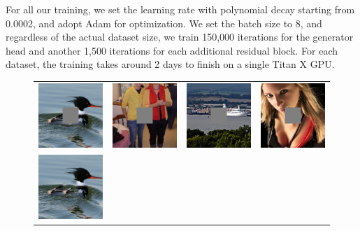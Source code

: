 For all our training, we set the learning rate with polynomial decay starting from 0.0002, and adopt Adam for optimization. We set the batch size to 8, and regardless of the actual dataset size, we train 150,000 iterations for the generator head and another 1,500 iterations for each additional residual block. For each dataset, the training takes around 2 days to finish on a single Titan X GPU.

\begin{figure}[H]
\centering
\small
\begin{tabular}{cccc}
  \includegraphics[width=.24\textwidth]{figures/imagenet/imagenet_0011_input_image.png}&
  \includegraphics[width=.24\textwidth]{figures/imagenet/imagenet_0034_input_image.png}&
  \includegraphics[width=.24\textwidth]{figures/imagenet/imagenet_0165_input_image.png}&
  \includegraphics[width=.24\textwidth]{figures/imagenet/imagenet_0197_input_image.png}\\
  \includegraphics[width=.24\textwidth]{figures/imagenet/imagenet_0011_pm.jpg}&

\end{tabular}
\end{figure}
